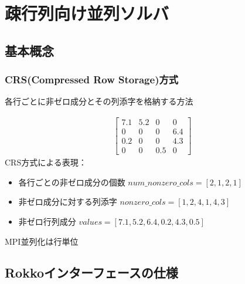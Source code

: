 \section{疎行列向け並列ソルバ}

\subsection{基本概念}

\begin{frame}[c,fragile]
  \frametitle{CRS(Compressed Row Storage)方式}
各行ごとに非ゼロ成分とその列添字を格納する方法

\begin{rei}%
\vspace{-2\baselineskip}
\begin{align*}
\begin{bmatrix}
7.1 & 5.2 & 0 & 0 \\
0 & 0 & 0 & 6.4 \\
0.2 & 0 & 0 & 4.3 \\
0 & 0 & 0.5 & 0
\end{bmatrix}
\end{align*}
CRS方式による表現：
\begin{itemize}
\item 各行ごとの非ゼロ成分の個数 $num\_nonzero\_cols = [2, 1, 2, 1]$
\item 非ゼロ成分に対する列添字 $nonzero\_cols = [1, 2, 4, 1, 4, 3]$
\item 非ゼロ行列成分 $values = [7.1, 5.2, 6.4, 0.2, 4.3, 0.5]$
\end{itemize}
\end{rei}

MPI並列化は行単位

\end{frame}

\subsection{Rokkoインターフェースの仕様}

